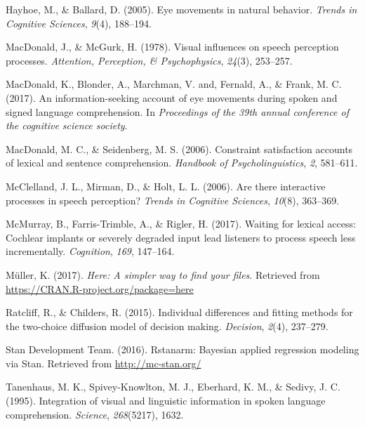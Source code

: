 \documentclass[english,man]{apa6}
\theoremstyle{definition}
\theoremstyle{definition}
\theoremstyle{definition}
\theoremstyle{remark}
\begin{document}
\leavevmode\hypertarget{ref-hayhoe2005eye}{}%
Hayhoe, M., \& Ballard, D. (2005). Eye movements in natural behavior.
\emph{Trends in Cognitive Sciences}, \emph{9}(4), 188--194.

\leavevmode\hypertarget{ref-macdonald1978visual}{}%
MacDonald, J., \& McGurk, H. (1978). Visual influences on speech
perception processes. \emph{Attention, Perception, \& Psychophysics},
\emph{24}(3), 253--257.

\leavevmode\hypertarget{ref-macdonald2017info}{}%
MacDonald, K., Blonder, A., Marchman, V. and, Fernald, A., \& Frank, M.
C. (2017). An information-seeking account of eye movements during spoken
and signed language comprehension. In \emph{Proceedings of the 39th
annual conference of the cognitive science society}.

\leavevmode\hypertarget{ref-macdonald2006constraint}{}%
MacDonald, M. C., \& Seidenberg, M. S. (2006). Constraint satisfaction
accounts of lexical and sentence comprehension. \emph{Handbook of
Psycholinguistics}, \emph{2}, 581--611.

\leavevmode\hypertarget{ref-mcclelland2006there}{}%
McClelland, J. L., Mirman, D., \& Holt, L. L. (2006). Are there
interactive processes in speech perception? \emph{Trends in Cognitive
Sciences}, \emph{10}(8), 363--369.

\leavevmode\hypertarget{ref-mcmurray2017waiting}{}%
McMurray, B., Farris-Trimble, A., \& Rigler, H. (2017). Waiting for
lexical access: Cochlear implants or severely degraded input lead
listeners to process speech less incrementally. \emph{Cognition},
\emph{169}, 147--164.

\leavevmode\hypertarget{ref-R-here}{}%
Müller, K. (2017). \emph{Here: A simpler way to find your files}.
Retrieved from \url{https://CRAN.R-project.org/package=here}

\leavevmode\hypertarget{ref-ratcliff2015individual}{}%
Ratcliff, R., \& Childers, R. (2015). Individual differences and fitting
methods for the two-choice diffusion model of decision making.
\emph{Decision}, \emph{2}(4), 237--279.

\leavevmode\hypertarget{ref-R-rstanarm}{}%
Stan Development Team. (2016). Rstanarm: Bayesian applied regression
modeling via Stan. Retrieved from \url{http://mc-stan.org/}

\leavevmode\hypertarget{ref-tanenhaus1995integration}{}%
Tanenhaus, M. K., Spivey-Knowlton, M. J., Eberhard, K. M., \& Sedivy, J.
C. (1995). Integration of visual and linguistic information in spoken
language comprehension. \emph{Science}, \emph{268}(5217), 1632.
\end{document}
